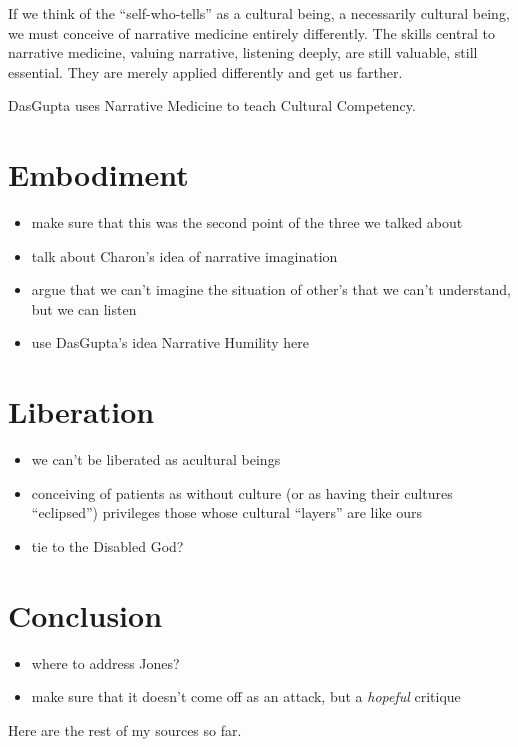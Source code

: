 \documentclass[12pt]{article}
\begin{document}
If we think of the ``self-who-tells'' as a cultural being, a necessarily
cultural being, we must conceive of narrative medicine entirely differently.
The skills central to narrative medicine, valuing narrative, listening deeply,
are still valuable, still essential. They are merely applied differently and
get us farther.

DasGupta uses Narrative Medicine to teach Cultural Competency.\autocite{DasGupta06}

\section{Embodiment}

\begin{itemize}
	\item make sure that this was the second point of the three we talked about
	\item talk about Charon's idea of narrative imagination
	\item argue that we can't imagine the situation of other's that we can't understand, but we can listen
	\item use DasGupta's idea Narrative Humility\autocite{DasGupta13} here
\end{itemize}

\section{Liberation}

\begin{itemize}
	\item we can't be liberated as acultural beings
	\item conceiving of patients as without culture (or as having their cultures ``eclipsed'') privileges those whose cultural ``layers'' are like ours
	\item tie to the Disabled God?
\end{itemize}

\section{Conclusion}

\begin{itemize}
	\item where to address Jones?
	\item make sure that it doesn't come off as an attack, but a \emph{hopeful} critique
\end{itemize}

\clearpage

Here are the rest of my sources so far.
\autocite{Eiesland05}
\autocite{Eiesland94}
\autocite{Fadiman97}
\autocite{Jones15a}
\autocite{Jones15b}
\autocite{Morris00}
\autocite{Sullivan95}

\clearpage
\printbibliography
\end{document}
